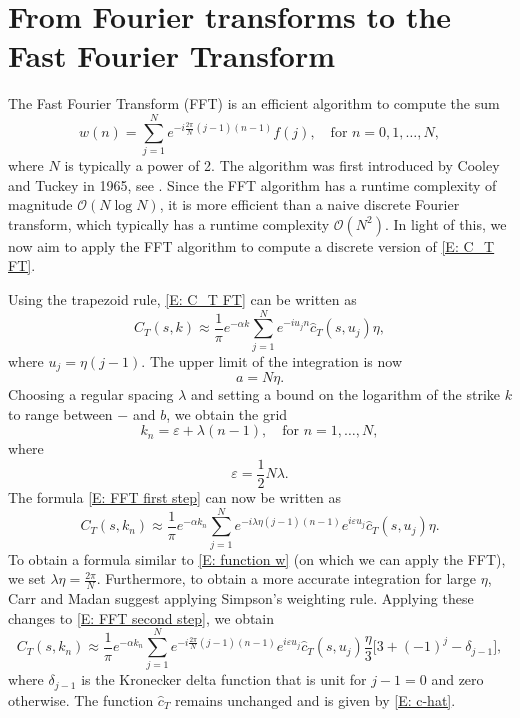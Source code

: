 \section{From Fourier transforms to the Fast Fourier Transform}
\label{appendix: From Fourier transforms to the Fast Fourier Transform}
The Fast Fourier Transform (FFT) is an efficient algorithm to compute the sum
\begin{equation}
    w(n) = \sum_{j=1}^N e^{-i \frac{2\pi}{N}(j-1)(n-1)} f(j), \quad \text{for } n=0,1,\ldots, N,
    \label{E: function w}
\end{equation}
where $N$ is typically a power of 2. The algorithm was first introduced by Cooley and Tuckey in 1965, see \cite{CooleyTukey1965}. Since the FFT algorithm has a runtime complexity of magnitude $\mathcal{O}(N \log N)$, it is more efficient than a naive discrete Fourier transform, which typically has a runtime complexity $\mathcal{O}(N^2)$. In light of this, we now aim to apply the FFT algorithm to compute a discrete version of \eqref{E: C_T FT}. 

Using the trapezoid rule, \eqref{E: C_T FT} can be written as
\begin{equation}
    C_T(s,k) \approx \frac{1}{\pi} e^{-\alpha k} \sum_{j=1}^N e^{-iu_jn} \hat c_T(s,u_j) \eta,
    \label{E: FFT first step}
\end{equation}
where $u_j = \eta (j-1)$. The upper limit of the integration is now 
\begin{equation*}
    a = N\eta. 
\end{equation*}
Choosing a regular spacing $\lambda$ and setting a bound on the logarithm of the strike $k$ to range between $-$ and $b$, we obtain the grid
\begin{equation*}
    k_n = \varepsilon + \lambda (n-1), \quad \text{for } n = 1, \ldots, N,
\end{equation*}
where
\begin{equation*}
    \varepsilon = \frac{1}{2} N \lambda. 
\end{equation*}
The formula \eqref{E: FFT first step} can now be written as
\begin{equation}
    C_T(s,k_n) \approx \frac{1}{\pi} e^{-\alpha k_n} \sum_{j=1}^N e^{-i \lambda \eta (j-1)(n-1)}e^{i \varepsilon u_j} \hat c_T(s,u_j) \eta.
    \label{E: FFT second step}
\end{equation}
To obtain a formula similar to \eqref{E: function w} (on which we can apply the FFT), we set $\lambda \eta = \frac{2\pi}{N}$. Furthermore, to obtain a more accurate integration for large $\eta$, Carr and Madan \cite{carr1999option} suggest applying Simpson's weighting rule. Applying these changes to \eqref{E: FFT second step}, we obtain
\begin{equation}
    C_T(s,k_n) \approx \frac{1}{\pi} e^{-\alpha k_n} \sum_{j=1}^N e^{-i\frac{2\pi}{N}(j-1)(n-1)}e^{i \varepsilon u_j} \hat c_T(s,u_j) \frac{\eta}{3} \big[ 3 + (-1)^j - \delta_{j-1} \big],
    \label{E: C_T FFT}
\end{equation}
where $\delta_{j-1}$ is the Kronecker delta function that is unit for $j-1=0$ and zero otherwise. The function $\hat c_T$ remains unchanged and is given by \eqref{E: c-hat}. 

